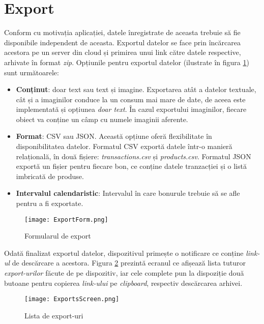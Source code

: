 \section{Export}\label{export}

Conform cu motivația aplicației, datele înregistrate de aceasta trebuie să fie disponibile independent de aceasta. Exportul datelor se face prin încărcarea acestora pe un server din cloud și primirea unui link către datele respective, arhivate în format \emph{zip}. Opțiunile pentru exportul datelor (ilustrate în figura \ref{fig:exportForm}) sunt următoarele:

\begin{itemize}
  \item
    \textbf{Conținut}: doar text sau text și imagine. Exportarea atât a datelor textuale, cât și a imaginilor conduce la un consum mai mare de date, de aceea este implementată și opțiunea \emph{doar text}. În cazul exportului imaginilor, fiecare obiect va conține un câmp cu numele imaginii aferente.
  \item
    \textbf{Format}: CSV sau JSON. Această opțiune oferă flexibilitate în disponibilitatea datelor. Formatul CSV exportă datele într-o manieră relațională, în două fișiere: \emph{transactions.csv} și \emph{products.csv}. Formatul JSON exportă un fișier pentru fiecare bon, ce conține datele tranzacției și o listă imbricată de produse.
  \item
    \textbf{Intervalul calendaristic}: Intervalul în care bonurule trebuie să se afle pentru a fi exportate.
\end{itemize}

\begin{figure}[ht]
  \centering
  \texttt{[image: ExportForm.png]}
  \caption{Formularul de export}
  \label{fig:exportForm}
\end{figure}

Odată finalizat exportul datelor, dispozitivul primește o notificare ce conține \emph{link-ul} de descărcare a acestora. Figura \ref{fig:exportsScreen} prezintă ecranul ce afișează lista tuturor \emph{export-urilor} făcute de pe dispozitiv, iar cele complete pun la dispoziție două butoane pentru copierea \emph{link-ului} pe \emph{clipboard}, respectiv descărcarea arhivei.

\begin{figure}[ht]
  \centering
  \texttt{[image: ExportsScreen.png]}
  \caption{Lista de export-uri}
  \label{fig:exportsScreen}
\end{figure}


